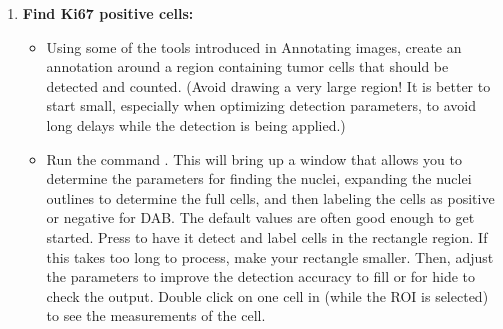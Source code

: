 \documentclass[a4paper,12pt]{article}
\begin{document}
\begin{enumerate}
    \item \textbf{Find Ki67 positive cells:}    \begin{itemize}
    \item Using some of the tools introduced in Annotating images, create an annotation around a region containing tumor cells that should be detected and counted. (Avoid drawing a very large region! It is better to start small, especially when optimizing detection parameters, to avoid long delays while the detection is being applied.)
    \item Run the command \soln {} \solnend. This will bring up a window that allows you to determine the parameters for finding the nuclei, expanding the nuclei outlines to determine the full cells, and then labeling the cells as positive or negative for DAB. The default values are often good enough to get started. Press \soln {} \solnend to have it detect and label cells in the rectangle region. If this takes too long to process, make your rectangle smaller. Then, adjust the parameters to improve the detection accuracy\soln {} \solnend to fill or \soln {} \solnend for hide to check the output. Double click on one cell in \soln {} \solnend (while the ROI is selected) to see the measurements of the cell.

\end{itemize}
\end{enumerate}
\end{document}
